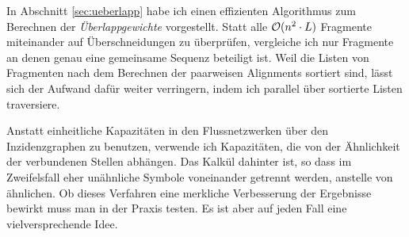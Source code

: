 In Abschnitt \ref{sec:ueberlapp} habe ich einen effizienten Algorithmus zum Berechnen der \emph{Überlappgewichte} vorgestellt. Statt alle $\mathcal{O}(n^2\cdot L)$ Fragmente miteinander auf Überschneidungen zu überprüfen, vergleiche ich nur Fragmente an denen genau eine gemeinsame Sequenz beteiligt ist. Weil die Listen von Fragmenten nach dem Berechnen der paarweisen Alignments sortiert sind, lässt sich der Aufwand dafür weiter verringern, indem ich parallel über sortierte Listen traversiere.

Anstatt einheitliche Kapazitäten in den Flussnetzwerken über den Inzidenzgraphen zu benutzen, verwende ich Kapazitäten, die von der Ähnlichkeit der verbundenen Stellen abhängen. Das Kalkül dahinter ist, so dass im Zweifelsfall eher unähnliche Symbole voneinander getrennt werden, anstelle von ähnlichen. Ob dieses Verfahren eine merkliche Verbesserung der Ergebnisse bewirkt muss man in der Praxis testen. Es ist aber auf jeden Fall eine vielversprechende Idee.













